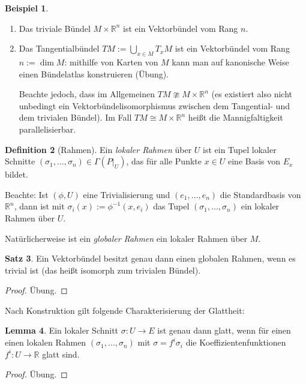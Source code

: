 \documentclass[a4paper]{scrreprt}
\numberwithin{equation}{chapter}
\newcommand{\R}{\mathbb{R}}
\theoremstyle{definition}
\newtheorem{defn}{Definition}[section]
\newtheorem{lemma}[defn]{Lemma}
\newtheorem{satz}[defn]{Satz}
\newtheorem{bsp}[defn]{Beispiel}
\newcommand{\bewUeb}{\begin{proof}Übung.\end{proof}}
\begin{document}
		
		\begin{bsp}\hfill
			\begin{enumerate}
				\item Das triviale Bündel $M\times \R^n$ ist ein Vektorbündel vom Rang $n$.
				\item Das Tangentialbündel $TM:=\bigcup_{x\in M}T_xM$ ist ein Vektorbündel vom Rang $n:=\dim M$: mithilfe von Karten von $M$ kann man auf kanonische Weise einen Bündelatlas konstruieren (Übung).

					Beachte jedoch, dass im Allgemeinen $TM\ncong M\times \R^n$ (es existiert also nicht unbedingt ein Vektorbündelisomorphismus zwischen dem Tangential- und dem trivialen Bündel). Im Fall $TM\cong M\times \R^n$ heißt die Mannigfaltigkeit parallelisierbar.
			\end{enumerate}
		\end{bsp}
		\begin{defn}[Rahmen]
			Ein \emph{lokaler Rahmen} über $U$ ist ein Tupel lokaler Schnitte $(\sigma_1,\ldots,\sigma_n)\in\Gamma(P\vert_U)$, das für alle Punkte $x\in U$ eine Basis von $E_x$ bildet. 
			
			Beachte: Ist $(\phi,U)$ eine Trivialisierung und $(e_1,\ldots,e_n)$ die Standardbasis von $\R^n$, dann ist mit $\sigma_i(x):=\phi^{-1}(x,e_i)$ das Tupel $(\sigma_1,\ldots,\sigma_n)$ ein lokaler Rahmen über $U$.
			
			Natürlicherweise ist ein \emph{globaler Rahmen} ein lokaler Rahmen über $M$.
		\end{defn}
		\begin{satz}
			Ein Vektorbündel besitzt genau dann einen globalen Rahmen, wenn es trivial ist (das heißt isomorph zum trivialen Bündel).
			\bewUeb
		\end{satz}
		Nach Konstruktion gilt folgende Charakterisierung der Glattheit:
		\begin{lemma} \label{lemma:schnitt_glatt_koeff_glatt}
			Ein lokaler Schnitt $\sigma\colon U\rightarrow E$ ist genau dann glatt, wenn für einen einen lokalen Rahmen $(\sigma_1,\ldots,\sigma_n)$ mit $\sigma=f^i\sigma_i$ die Koeffizientenfunktionen $f^i\colon U\rightarrow \R$ glatt sind.
			\bewUeb
		\end{lemma}
\end{document}
